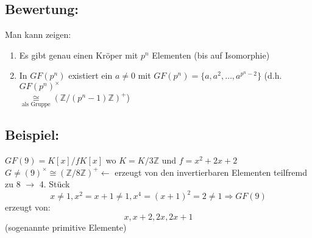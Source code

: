 \subsection{Bewertung:} 
Man kann zeigen:
\begin{enumerate}[label={(\alph*)}]
	\item Es gibt genau einen Kröper mit $p^{n}$ Elementen (bis auf Isomorphie)
	\item In $GF(p^{n})$ existiert ein $a \neq 0$ mit $GF(p^{n})=\{a,a^{2},\dotsc, 
			a^{p^{n}-2}\}$ (d.h. $GF(p^{n})^{\times}$ \\
			$\mathop{\cong}\limits_{\text{als Gruppe}}
			(\mathbb{Z}/(p^{n}-1)\mathbb{Z})^{+}$)
\end{enumerate}
%
%
%
\subsection{Beispiel:}
$GF(9) = K[x]/fK[x]$ wo $K = K/3\mathbb{Z}$ und $f=x^{2}+2x+2$\\
$G \neq (9)^{\times} \cong ( \mathbb{Z}/8\mathbb{Z})^{+} \leftarrow$ erzeugt von den invertierbaren Elementen teilfremd zu 8 $\rightarrow$ 4. Stück\\
\begin{equation*}
x \neq 1, x^{2}=x+1 \neq 1, x^{4} = (x+1)^{2}=2 \neq 1 \Rightarrow GF(9)
\end{equation*}
erzeugt von:
\begin{equation*}
x, x+2, 2x, 2x+1
\end{equation*}
(sogenannte primitive Elemente)